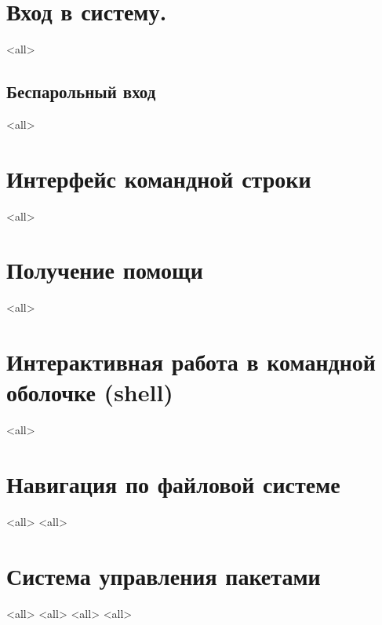 \section{Вход в систему.}
\mode<all>{}
\subsection{Беспарольный вход}
\mode<all>{}

\section{Интерфейс командной строки}
\mode<all>{}

\section{Получение помощи}
\mode<all>{}

\section{Интерактивная работа в командной оболочке (shell)}
\mode<all>{}

\section{Навигация по файловой системе}
\mode<all>{}
\mode<all>{}

\section{Система управления пакетами}
\mode<all>{}
\mode<all>{}
\mode<all>{}
\mode<all>{}


